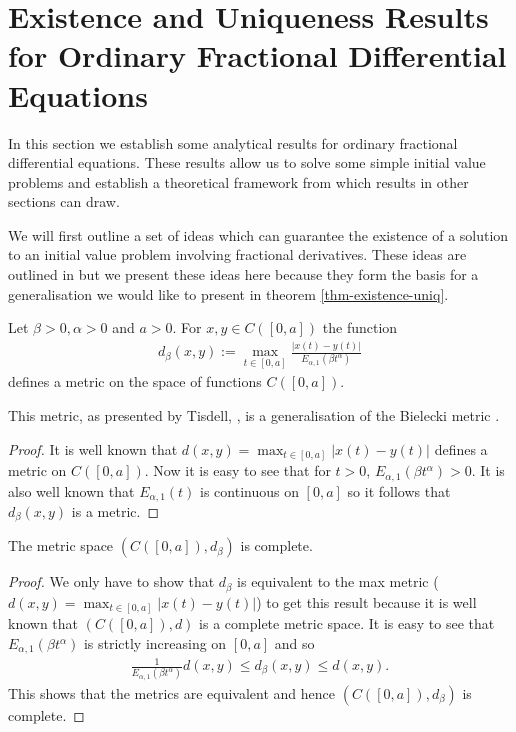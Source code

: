 \section{Existence and Uniqueness Results for Ordinary Fractional Differential Equations}
In this section we establish some analytical results for ordinary fractional differential equations. These results allow us to solve some simple initial value problems and establish a theoretical framework from which results in other sections can draw.

We will first outline a set of ideas which can guarantee the existence of a solution to an initial value problem involving fractional derivatives. These ideas are outlined in \cite{Tisdell2012} but we present these ideas here because they form the basis for a generalisation we would like to present in theorem \ref{thm-existence-uniq}.

\begin{mdframed}[innertopmargin=10pt]
\begin{propdef}
    Let $ \beta > 0, \alpha > 0 $ and $ a > 0 $. For $ x,y \in C([0,a]) $ the function
    \begin{align*}
        d_{\beta}(x,y) := \max_{t \in [0,a]} \frac{|x(t) - y(t)|}{E_{\alpha,1}(\beta t^\alpha)}
    \end{align*}
    defines a metric on the space of functions $ C([0,a]) $. 
\end{propdef}
\end{mdframed}

This metric, as presented by Tisdell, \cite{Tisdell2012}, is a generalisation of the Bielecki metric \cite{Tisdell2012, Bielecki1956}. 

\begin{proof}
    It is well known that $ d(x,y) = \max_{t \in [0,a]}|x(t) - y(t)| $ defines a metric on $C([0,a]) $. Now it is easy to see that for $ t > 0 $, $ E_{\alpha,1}(\beta t^\alpha) >0 $. It is also well known that $ E_{\alpha,1}(t) $ is continuous on $ [0, a] $ so it follows that $ d_{\beta}(x,y) $ is a metric.
\end{proof}

\begin{mdframed}[innertopmargin=10pt]
\begin{lemma}
    The metric space $ (C([0,a]), d_\beta) $ is complete.
\end{lemma}
\end{mdframed}
\begin{proof}
    We only have to show that $ d_\beta $ is equivalent to the max metric ($ d(x,y) = \max_{t \in [0,a]}|x(t) - y(t)| $) to get this result because it is well known that $ (C([0,a]), d) $ is a complete metric space.
    It is easy to see that $ E_{\alpha, 1}(\beta t^\alpha) $ is strictly increasing on $ [0, a] $ and so 
    \begin{align}
        \frac{1}{E_{\alpha, 1}(\beta t^\alpha)} d(x,y) \leq d_\beta(x,y) \leq d(x,y).
    \end{align}
    This shows that the metrics are equivalent and hence $ (C([0,a]), d_\beta) $ is complete.
\end{proof}

